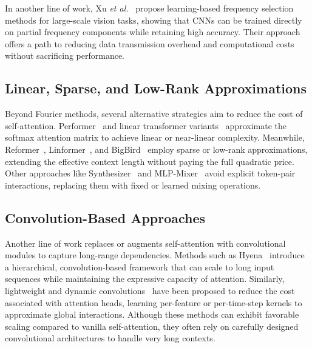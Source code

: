 In another line of work, Xu \emph{et al.}~\cite{xu2020learningfrequencydomain} propose learning-based frequency selection methods for large-scale vision tasks, showing that CNNs can be trained directly on partial frequency components while retaining high accuracy. Their approach offers a path to reducing data transmission overhead and computational costs without sacrificing performance.

\subsection{Linear, Sparse, and Low-Rank Approximations}
\label{subsec:linear_sparse}
Beyond Fourier methods, several alternative strategies aim to reduce the cost of self-attention. Performer~\cite{choromanski2021rethinking} and linear transformer variants~\cite{katharopoulos2020transformers} approximate the softmax attention matrix to achieve linear or near-linear complexity. Meanwhile, Reformer~\cite{kitaev2020reformer}, Linformer~\cite{wang2020linformer}, and BigBird~\cite{zaheer2020bigbird} employ sparse or low-rank approximations, extending the effective context length without paying the full quadratic price. Other approaches like Synthesizer~\cite{tay2020synthesizer} and MLP-Mixer~\cite{tolstikhin2021mlpmixer} avoid explicit token-pair interactions, replacing them with fixed or learned mixing operations.

\subsection{Convolution-Based Approaches}
\label{subsec:convolution_based_approaches}
Another line of work replaces or augments self-attention with convolutional modules to capture long-range dependencies. Methods such as Hyena~\cite{poli2023hyenahierarchylargerconvolutional} introduce a hierarchical, convolution-based framework that can scale to long input sequences while maintaining the expressive capacity of attention. Similarly, lightweight and dynamic convolutions~\cite{wu2019pay} have been proposed to reduce the cost associated with attention heads, learning per-feature or per-time-step kernels to approximate global interactions. Although these methods can exhibit favorable scaling compared to vanilla self-attention, they often rely on carefully designed convolutional architectures to handle very long contexts.

